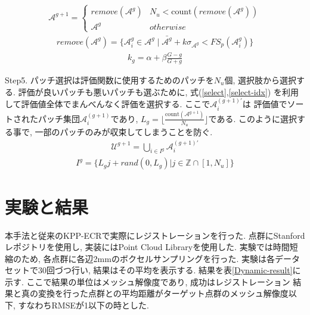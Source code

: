 \documentclass[twocolumn, 9pt, a4j, dvipdfmx]{jsarticle}
\begin{document}
\begin{align}
    \label{restrict}
    \mathcal{A}^{g+1}=
    \begin{cases}
        remove(\mathcal{A}^g) & N_u < \text{count}(remove(\mathcal{A}^g))\\
        \mathcal{A}^g & otherwise
    \end{cases}
\end{align}
\vspace{-2em}
\begin{align}
    \label{remove}
    remove(\mathcal{A}^g) = \{
        \mathcal{A}^g_i \in \mathcal{A}^g \mid 
        \bar{\mathcal{A}^g} + k\sigma_{\mathcal{A}^g} < FS_p(\mathcal{A}^g_i)
    \}
\end{align}
\vspace{-2em}
\begin{align}
    \label{trim-rate}
    k_g = \alpha + \beta \frac{G-g}{G+g}
\end{align}

Step5. パッチ選択は評価関数に使用するためのパッチを$N_u$個, 選択肢から選択する. 
評価が良いパッチも悪いパッチも選ぶために, 式(\ref{select},\ref{select-idx})
を利用して評価値全体でまんべんなく評価を選択する. 
ここで$\mathcal{A}_i^{(g+1) '}$は
評価値でソートされたパッチ集団$\mathcal{A}_i^{(g+1)}$であり, 
$L_g = \lfloor \frac{\text{count}(\mathcal{A}^{g+1})}{N_u} \rfloor$である. 
このように選択する事で, 一部のパッチのみが収束してしまうことを防ぐ. 
\begin{align}
    \label{select}
    \mathcal{U}^{g+1} = \bigcup_{i \in I^g} \mathcal{A}^{(g+1) '}_i 
\end{align}
\vspace{-2em}
\begin{align}
    \label{select-idx}
    I^g = \{L_g j + rand (0, L_g) | j \in \mathbb{Z} \cap [1, N_u]\}
\end{align}

\section{実験と結果}
本手法と従来のKPP-ECRで実際にレジストレーションを行った. 
点群にStanfordレポジトリ\cite{stanford}を使用し, 
実装にはPoint Cloud Library\cite{PCL}を使用した. 
実験では時間短縮のため, 各点群に各辺2mmのボクセルサンプリングを行った.  
実験は各データセットで30回づつ行い, 結果はその平均を表示する. 
結果を表\ref{Dynamic-result}に示す. 
ここで結果の単位はメッシュ解像度であり, 成功はレジストレーション
結果と真の変換を行った点群との平均距離がターゲット点群のメッシュ解像度以下,
すなわちRMSEが1以下の時とした. 
\end{document}
